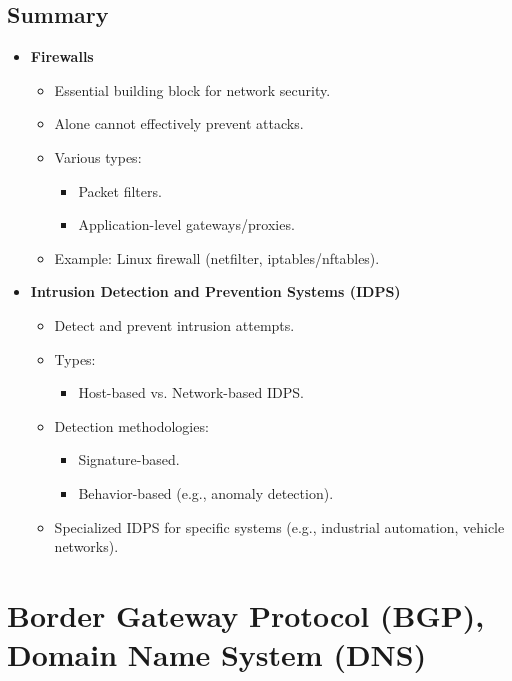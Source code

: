 \subsection{Summary}
\begin{itemize}
    \item \textbf{Firewalls}
    \begin{itemize}
        \item Essential building block for network security.
        \item Alone cannot effectively prevent attacks.
        \item Various types:
        \begin{itemize}
            \item Packet filters.
            \item Application-level gateways/proxies.
        \end{itemize}
        \item Example: Linux firewall (netfilter, iptables/nftables).
    \end{itemize}
    \item \textbf{Intrusion Detection and Prevention Systems (IDPS)}
    \begin{itemize}
        \item Detect and prevent intrusion attempts.
        \item Types:
        \begin{itemize}
            \item Host-based vs. Network-based IDPS.
        \end{itemize}
        \item Detection methodologies:
        \begin{itemize}
            \item Signature-based.
            \item Behavior-based (e.g., anomaly detection).
        \end{itemize}
        \item Specialized IDPS for specific systems (e.g., industrial automation, vehicle networks).
    \end{itemize}
\end{itemize}

\section{Border Gateway Protocol (BGP), Domain Name System (DNS)}
